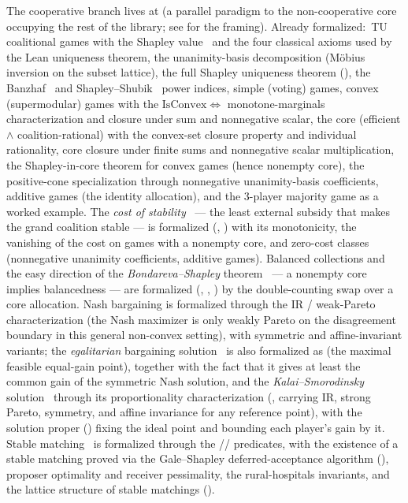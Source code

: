 The cooperative branch lives at  (a parallel
paradigm to the non-cooperative core occupying the rest of the
library; see  for the
framing).  Already formalized:\ TU coalitional games with the
Shapley value~\citep{Shapley1953} and the four classical axioms
used by the Lean uniqueness theorem,
the unanimity-basis decomposition (Möbius inversion on the subset
lattice), the full Shapley uniqueness theorem
(), the Banzhaf~\citep{Banzhaf1965} and
Shapley–Shubik~\citep{ShapleyShubik1954} power indices, simple
(voting) games, convex (supermodular) games with the
$\mathrm{IsConvex} \Leftrightarrow$ monotone-marginals characterization
\citep{Shapley1971} and closure under sum and nonnegative scalar,
the core (efficient $\land$ coalition-rational) with the
convex-set closure property and individual rationality, core
closure under finite sums and nonnegative scalar multiplication,
the Shapley-in-core theorem for convex games (hence nonempty core),
the positive-cone specialization through nonnegative
unanimity-basis coefficients, additive games (the identity
allocation), and the 3-player majority game as a worked example.
The \emph{cost of stability}~\citep{Bachrach2009} — the least external
subsidy that makes the grand coalition stable — is formalized
(, ) with its monotonicity, the
vanishing of the cost on games with a nonempty core, and zero-cost
classes (nonnegative unanimity coefficients, additive games).
Balanced collections and the easy direction of the
\emph{Bondareva–Shapley} theorem~\citep{Bondareva1963, Shapley1967}
— a nonempty core implies balancedness — are formalized
(, ,
) by the double-counting swap over a core
allocation.
Nash bargaining
\citep{Nash1950bargaining} is formalized through the IR / weak-Pareto
characterization (the Nash maximizer is only weakly Pareto on the
disagreement boundary in this general non-convex setting), with
symmetric and affine-invariant variants;
the \emph{egalitarian} bargaining solution~\citep{Kalai1977} is also
formalized as  (the maximal feasible equal-gain
point), together with the fact that it gives at least the common gain
of the symmetric Nash solution, and the
\emph{Kalai–Smorodinsky} solution~\citep{KalaiSmorodinsky1975} through
its proportionality characterization
(, carrying IR, strong Pareto,
symmetry, and affine invariance for any reference point), with the
solution proper () fixing the ideal point and
bounding each player's gain by it.
Stable matching~\citep{GaleShapley1962} is formalized through the
// predicates, with the
existence of a stable matching proved via the Gale–Shapley
deferred-acceptance algorithm (), proposer
optimality and receiver pessimality, the rural-hospitals invariants,
and the lattice structure of stable matchings
().

